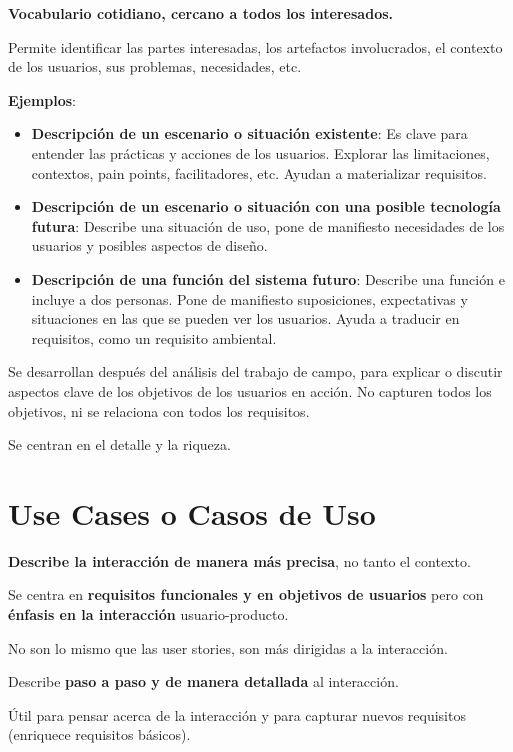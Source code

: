 \documentclass[12pt]{report} %
\begin{document}
\textbf{Vocabulario cotidiano, cercano a todos los interesados.}

Permite identificar las partes interesadas, los artefactos involucrados,
el contexto de los usuarios, sus problemas, necesidades, etc.

\textbf{Ejemplos}:

\begin{itemize}

\item
  \textbf{Descripción de un escenario o situación existente}: Es clave
  para entender las prácticas y acciones de los usuarios. Explorar las
  limitaciones, contextos, pain points, facilitadores, etc. Ayudan a
  materializar requisitos.
\item
  \textbf{Descripción de un escenario o situación con una posible
  tecnología futura}: Describe una situación de uso, pone de manifiesto
  necesidades de los usuarios y posibles aspectos de diseño.
\item
  \textbf{Descripción de una función del sistema futuro}: Describe una
  función e incluye a dos personas. Pone de manifiesto suposiciones,
  expectativas y situaciones en las que se pueden ver los usuarios.
  Ayuda a traducir en requisitos, como un requisito ambiental.
\end{itemize}

Se desarrollan después del análisis del trabajo de campo, para explicar
o discutir aspectos clave de los objetivos de los usuarios en acción. No
capturen todos los objetivos, ni se relaciona con todos los requisitos.

Se centran en el detalle y la riqueza.

\section{Use Cases o Casos de Uso}

\textbf{Describe la interacción de manera más precisa}, no tanto el
contexto.

Se centra en \textbf{requisitos funcionales y en objetivos de usuarios} pero
con \textbf{énfasis en la interacción} usuario-producto.

No son lo mismo que las user stories, son más dirigidas a la
interacción.

Describe \textbf{paso a paso y de manera detallada} al interacción.

Útil para pensar acerca de la interacción y para capturar nuevos
requisitos (enriquece requisitos básicos).
\end{document}
